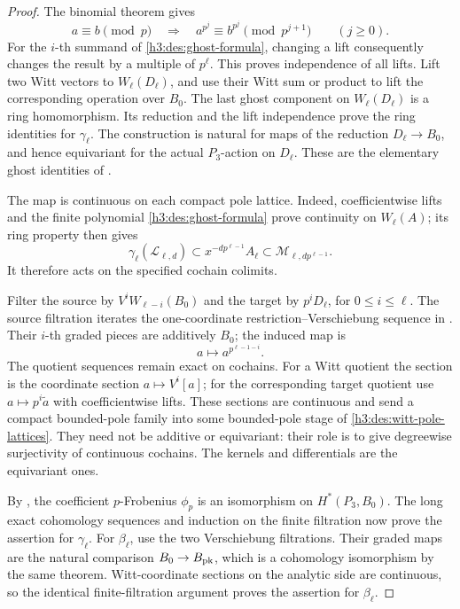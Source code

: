 \begin{proof}
The binomial theorem gives
\[
 a\equiv b\pmod p
 \quad\Longrightarrow\quad
 a^{p^j}\equiv b^{p^j}\pmod {p^{j+1}}
 \qquad(j\geq0).
\]
For the \(i\)-th summand of \eqref{h3:des:ghost-formula},
changing a lift consequently changes the result by a
multiple of \(p^\ell\).  This proves independence of all
lifts.
Lift two Witt vectors to \(W_\ell(D_\ell)\), and use their
Witt sum or product to lift the corresponding operation
over \(B_0\).  The last ghost component on
\(W_\ell(D_\ell)\) is a ring homomorphism.  Its reduction
and the lift independence prove the ring identities for
\(\gamma_\ell\).  The construction is natural for maps
of the reduction \(D_\ell\to B_0\), and hence equivariant
for the actual \(P_3\)-action on \(D_\ell\).
These are the elementary ghost identities of
\cite[Lemma~1 and Proposition~2]{Hesselholt}.

The map is continuous on each compact pole lattice.
Indeed, coefficientwise lifts and the finite polynomial
\eqref{h3:des:ghost-formula} prove continuity on \(W_\ell(A)\);
its ring property then gives
\[
 \gamma_\ell(\mathcal L_{\ell,d})
       \subset x^{-dp^{\ell-1}}A_\ell
       \subset\mathcal M_{\ell,dp^{\ell-1}}.
\]
It therefore acts on the specified cochain colimits.

Filter the source by \(V^iW_{\ell-i}(B_0)\) and the target
by \(p^iD_\ell\), for \(0\leq i\leq\ell\).
The source filtration iterates the one-coordinate
restriction--Verschiebung sequence in
\cite[proof of Lemma~9, p.~6]{Hesselholt}.
Their \(i\)-th graded pieces are additively \(B_0\);
the induced map is
\[
 a\longmapsto a^{p^{\ell-1-i}}.
\]
The quotient sequences remain exact on cochains.
For a Witt quotient the section is the coordinate
section \(a\mapsto V^i[a]\); for the corresponding
target quotient use \(a\mapsto p^i\widetilde a\) with
coefficientwise lifts.  These sections are continuous
and send a compact bounded-pole family into some
bounded-pole stage of \eqref{h3:des:witt-pole-lattices}.
They need not be additive or equivariant: their role
is to give degreewise surjectivity of continuous
cochains.  The kernels and differentials are the
equivariant ones.

By , the coefficient
\(p\)-Frobenius \(\phi_p\) is an isomorphism on
\(H^*(P_3,B_0)\).
The long exact cohomology sequences and induction on
the finite filtration now prove the assertion for
\(\gamma_\ell\).
For \(\beta_\ell\), use the two Verschiebung
filtrations.  Their graded maps are the natural
comparison \(B_0\to B_{\mathrm{pk}}\), which is a cohomology
isomorphism by the same theorem.  Witt-coordinate
sections on the analytic side are continuous, so the
identical finite-filtration argument proves the
assertion for \(\beta_\ell\).


\end{proof}
